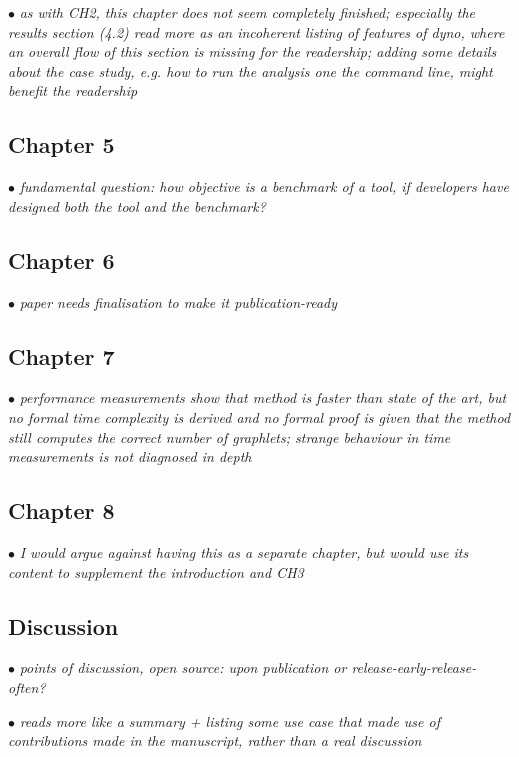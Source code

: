 \documentclass[10pt]{article}
\newcommand{\exam}[2][\  ]{\hspace{0pt}\marginpar{\color{red}#1}$\bullet$ \textit{#2}}
\newcommand{\imp}[1]{{\color{red} #1}}
\newcommand{\bigexclaim}{\raisebox{-0.1em}{\BigTriangleUp}\hspace{-0.32em}\llap{\small\textbf{!}}\hspace{0.32em}}
\newcommand{\tagimp}{\bigexclaim}
\begin{document}
{\exam{as with CH2, this chapter does not seem completely finished; especially the results section (4.2) read more as an incoherent listing of features of dyno, where an overall flow of this section is missing for the readership; adding some details about the case study, e.g. how to run the analysis one the command line, might benefit the readership}

\subsection{Chapter 5}

\exam[\tagimp]{fundamental question: \imp{how objective is a benchmark of a tool, if developers have designed both the tool and the benchmark?}}

\subsection{Chapter 6}

\exam{paper needs finalisation to make it publication-ready}

\subsection{Chapter 7}

\exam{performance measurements show that method is faster than state of the art, but no formal time complexity is derived and no formal proof is given that the method still computes the correct number of graphlets; strange behaviour in time measurements is not diagnosed in depth}

\subsection{Chapter 8}

\exam{I would argue against having this as a separate chapter, but would use its content to supplement the introduction and CH3}

\subsection{Discussion}

\exam{points of discussion, open source: upon publication or release-early-release-often?}

\exam[\tagimp]{\imp{reads more like a summary} + listing some use case that made use of contributions made in the manuscript, rather than a real discussion}

}
\end{document}
